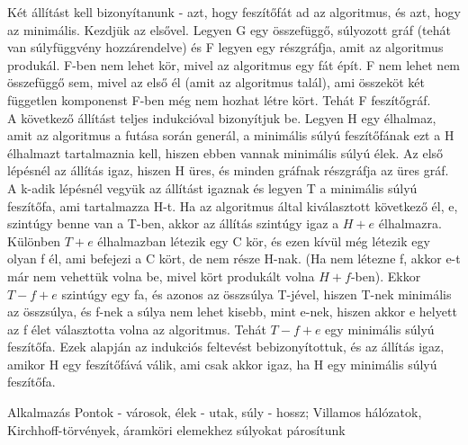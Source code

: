\begin{bizonyitas}{}
Két állítást kell bizonyítanunk - azt, hogy feszítőfát ad az algoritmus, és azt, hogy az minimális. Kezdjük az elsővel. Legyen G egy összefüggő, súlyozott gráf (tehát van súlyfüggvény hozzárendelve) és F legyen egy részgráfja, amit az algoritmus produkál. F-ben nem lehet kör, mivel az algoritmus egy fát épít. F nem lehet nem összefüggő sem, mivel az első él (amit az algoritmus talál), ami összeköt két független komponenst F-ben még nem hozhat létre kört. Tehát F feszítőgráf.
\\
A következő állítást teljes indukcióval bizonyítjuk be. Legyen H egy élhalmaz, amit az algoritmus a futása során generál, a minimális súlyú feszítőfának ezt a H élhalmazt tartalmaznia kell, hiszen ebben vannak minimális súlyú élek.
Az első lépésnél az állítás igaz, hiszen H üres, és minden gráfnak részgráfja az üres gráf. A k-adik lépésnél vegyük az állítást igaznak és legyen T a minimális súlyú feszítőfa, ami tartalmazza H-t. Ha az algoritmus által kiválasztott következő él, e, szintúgy benne van a T-ben, akkor az állítás szintúgy igaz a $H + {e}$ élhalmazra. Különben $T + {e}$ élhalmazban létezik egy C kör, és ezen kívül még létezik egy olyan f él, ami befejezi a C kört, de nem része H-nak. (Ha nem létezne f, akkor e-t már nem vehettük volna be, mivel kört produkált volna $H + f$-ben). Ekkor $T - {f} + {e}$ szintúgy egy fa, és azonos az összsúlya T-jével, hiszen T-nek minimális az összsúlya, és f-nek a súlya nem lehet kisebb, mint e-nek, hiszen akkor e helyett az f élet választotta volna az algoritmus. Tehát $T - {f} + {e}$ egy minimális súlyú feszítőfa. Ezek alapján az indukciós feltevést bebizonyítottuk, és az állítás igaz, amikor H egy feszítőfává válik, ami csak akkor igaz, ha H egy minimális súlyú feszítőfa.
\end{bizonyitas}

\begin{tetel}{Alkalmazás}
Pontok - városok, élek - utak, súly - hossz; Villamos hálózatok, Kirchhoff-törvények, áramköri elemekhez súlyokat párosítunk
\end{tetel}

